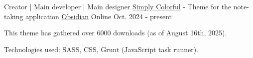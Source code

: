 



\begin{cventries}
  \cventry
    {Creator | Main developer | Main designer} %
    {\underline{\href{https://github.com/LorenzoPegorari/SimplyColorful}{Simply Colorful}} - Theme for the note-taking application \underline{\href{https://obsidian.md}{Obsidian}}} %
    {Online} %
    {Oct. 2024 - present} %
    {
      \begin{cvitems} %
        \item {This theme has gathered over 6000 downloads (as of August 16th, 2025).}
        \item {Technologies used: SASS, CSS, Grunt (JavaScript task runner).}
      \end{cvitems}
    }

\end{cventries}
